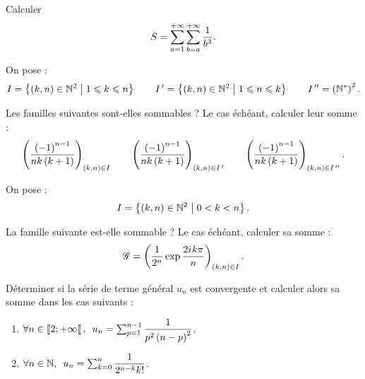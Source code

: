 \begin{exo}[Exercice 19]
Calculer \[S=\sum_{a=1}^{+\infty}\sum_{b=a}^{+\infty}\dfrac{1}{b^3}.\]
\end{exo}

\begin{corr}
\end{corr}

\begin{exo}[Exercice 20]
On pose : \[I=\left\lbrace\left(k,n\right)\in\mathbb{N}^2\;\middle|\;1\leqslant k\leqslant n\right\rbrace\qquad I^{\,\prime}=\left\lbrace\left(k,n\right)\in\mathbb{N}^2\;\middle|\;1\leqslant n\leqslant k\right\rbrace\qquad I^{\,\prime\prime}=\left(\mathbb{N}^*\right)^2.\]

Les familles suivantes sont-elles sommables ? Le cas échéant, calculer leur somme : \[\left(\dfrac{\left(-1\right)^{n-1}}{nk\left(k+1\right)}\right)_{\left(k,n\right)\in I}\qquad\left(\dfrac{\left(-1\right)^{n-1}}{nk\left(k+1\right)}\right)_{\left(k,n\right)\in I^{\,\prime}}\qquad\left(\dfrac{\left(-1\right)^{n-1}}{nk\left(k+1\right)}\right)_{\left(k,n\right)\in I^{\,\prime\prime}}.\]
\end{exo}

\begin{corr}
\end{corr}

\begin{exo}
On pose : \[I=\left\lbrace\left(k,n\right)\in\mathbb{N}^2\;\middle|\;0<k<n\right\rbrace.\]

La famille suivante est-elle sommable ? Le cas échéant, calculer sa somme : \[\mathscr{G}=\left(\dfrac{1}{2^n}\exp\dfrac{2i\mkern1mu k\pi}{n}\right)_{\left(k,n\right)\in I}.\]
\end{exo}

\begin{corr}
\end{corr}

\begin{exo}[Exercice 21]
Déterminer si la série de terme général \(u_n\) est convergente et calculer alors sa somme dans les cas suivants :

\begin{enumerate}
\item \(\quantifs{\forall n\in\interventierie{2}{\pinf}}u_n=\sum_{p=1}^{n-1}\dfrac{1}{p^2\paren{n-p}^2}\). \\

\item \(\quantifs{\forall n\in\N}u_n=\sum_{k=0}^n\dfrac{1}{2^{n-k}k!}\).
\end{enumerate}
\end{exo}

\begin{corr}
\end{corr}


